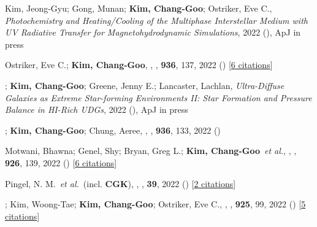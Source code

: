 \item[{43.}]Kim, Jeong-Gyu; Gong, Munan; \textbf{Kim, Chang-Goo}; Ostriker, Eve C., \textit{Photochemistry and Heating/Cooling of the Multiphase Interstellar Medium with UV Radiative Transfer for Magnetohydrodynamic Simulations}, 2022 (), ApJ in press

\item[{42.}]Ostriker, Eve C.; \textbf{Kim, Chang-Goo}, , \apj, \textbf{936}, 137, 2022 () [\href{http://adsabs.harvard.edu/abs/2022ApJ...936..137O}{6 citations}]

\item[{41.}]; \textbf{Kim, Chang-Goo}; Greene, Jenny E.; Lancaster, Lachlan, \textit{Ultra-Diffuse Galaxies as Extreme Star-forming Environments II: Star Formation and Pressure Balance in HI-Rich UDGs}, 2022 (), ApJ in press

\item[{40.}]; \textbf{Kim, Chang-Goo}; Chung, Aeree, , \apj, \textbf{936}, 133, 2022 ()

\item[{39.}]Motwani, Bhawna; Genel, Shy; Bryan, Greg L.; \textbf{Kim, Chang-Goo}~\textit{et al.}, , \apj, \textbf{926}, 139, 2022 () [\href{http://adsabs.harvard.edu/abs/2022ApJ...926..139M}{6 citations}]

\item[{38.}]Pingel, N. M.~\textit{et al.}~(incl. \textbf{CGK}), , \pasa, \textbf{39}, 2022 () [\href{http://adsabs.harvard.edu/abs/2022PASA...39....5P}{2 citations}]

\item[{37.}]; Kim, Woong-Tae; \textbf{Kim, Chang-Goo}; Ostriker, Eve C., , \apj, \textbf{925}, 99, 2022 () [\href{http://adsabs.harvard.edu/abs/2022ApJ...925...99M}{5 citations}]

